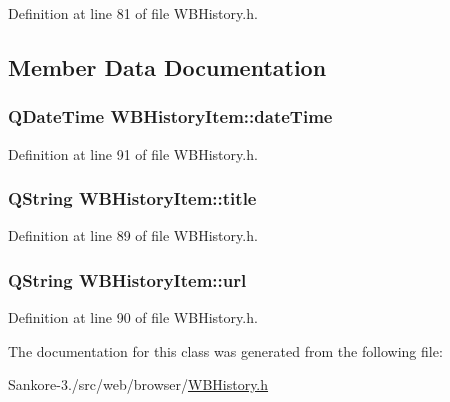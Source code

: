 Definition at line 81 of file W\-B\-History.\-h.



\subsection{Member Data Documentation}
\hypertarget{class_w_b_history_item_ad980324142b673c15d0f0b30f1d72920}{
\subsubsection[{date\-Time}]{\setlength{\rightskip}{0pt plus 5cm}Q\-Date\-Time W\-B\-History\-Item\-::date\-Time}}\label{db/d07/class_w_b_history_item_ad980324142b673c15d0f0b30f1d72920}


Definition at line 91 of file W\-B\-History.\-h.

\hypertarget{class_w_b_history_item_a864c9e04f1b6d92445dd3980894b3fbc}{
\subsubsection[{title}]{\setlength{\rightskip}{0pt plus 5cm}Q\-String W\-B\-History\-Item\-::title}}\label{db/d07/class_w_b_history_item_a864c9e04f1b6d92445dd3980894b3fbc}


Definition at line 89 of file W\-B\-History.\-h.

\hypertarget{class_w_b_history_item_a09a9594a8300aefea4744b04890fb673}{
\subsubsection[{url}]{\setlength{\rightskip}{0pt plus 5cm}Q\-String W\-B\-History\-Item\-::url}}\label{db/d07/class_w_b_history_item_a09a9594a8300aefea4744b04890fb673}


Definition at line 90 of file W\-B\-History.\-h.



The documentation for this class was generated from the following file\-:\begin{DoxyCompactItemize}
\item 
Sankore-\/3./src/web/browser/\hyperlink{_w_b_history_8h}{W\-B\-History.\-h}\end{DoxyCompactItemize}
